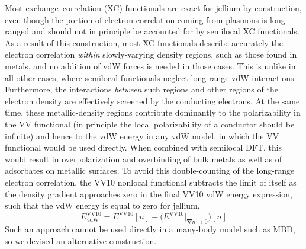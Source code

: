 Most exchange--correlation (XC) functionals are exact for jellium by construction, even though the portion of electron correlation coming from plasmons is long-ranged and should not in principle be accounted for by semilocal XC functionals.
As a result of this construction, most XC functionals describe accurately the electron correlation \emph{within} slowly-varying density regions, such as those found in metals, and no addition of vdW forces is needed in those cases.
This is unlike in all other cases, where semilocal functionals neglect long-range vdW interactions.
Furthermore, the interactions \emph{between} such regions and other regions of the electron density are effectively screened by the conducting electrons.
At the same time, these metallic-density regions contribute dominantly to the polarizability in the VV functional (in principle the local polarizability of a conductor should be infinite) and hence to the vdW energy in any vdW model, in which the VV functional would be used directly.
When combined with semilocal DFT, this would result in overpolarization and overbinding of bulk metals as well as of adsorbates on metallic surfaces.
To avoid this double-counting of the long-range electron correlation, the VV10 nonlocal functional subtracts the limit of itself as the density gradient approaches zero in the final VV10 vdW energy expression, such that the vdW energy is equal to zero for jellium,
\begin{equation}
  E_\text{vdW}^\text{VV10} = E^\text{VV10}[n]-\big(E^\text{VV10}|_{\boldsymbol\nabla n\rightarrow0}\big)[n]
\end{equation}
Such an approach cannot be used directly in a many-body model such as MBD, so we devised an alternative construction.

